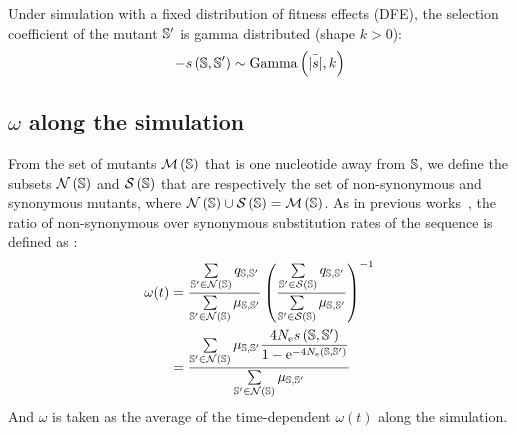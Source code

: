 Under simulation with a fixed distribution of fitness effects (\acrshort{DFE}), the selection coefficient of the mutant $\mathbb{S}'$ is gamma distributed (shape $k > 0$):
\begin{equation}
    - s \left( \mathbb{S},\mathbb{S}'\right) \sim \text{Gamma} \left( \bar{|s|}, k \right)
\end{equation}

\subsection{\texorpdfstring{$\omega$}{ω} along the simulation}
From the set of mutants $\mathcal{M}\left(\mathbb{S}\right)$ that is one nucleotide away from $\mathbb{S}$, we define the subsets $\mathcal{N}\left(\mathbb{S}\right)$ and $\mathcal{S}\left(\mathbb{S}\right)$ that are respectively the set of non-synonymous and synonymous mutants, where $\mathcal{N}\left(\mathbb{S}\right) \cup \mathcal{S}\left(\mathbb{S}\right) = \mathcal{M}\left(\mathbb{S}\right)$.
As in previous works~\citep{Spielman2015, DosReis2015, Jones2016}, the ratio of non-synonymous over synonymous substitution rates of the sequence is defined as :
\begin{align}
    \omega(t) &= \dfrac{\sum\limits_{\mathbb{S}' \in \mathcal{N}\left(\mathbb{S}\right)} q_{\mathbb{S}, \mathbb{S}'}}{\sum\limits_{\mathbb{S}' \in \mathcal{N}\left(\mathbb{S}\right)} \mu_{\mathbb{S}, \mathbb{S}'}} \left( \dfrac{\sum\limits_{\mathbb{S}' \in \mathcal{S}\left(\mathbb{S}\right)} q_{\mathbb{S}, \mathbb{S}'}}{\sum\limits_{\mathbb{S}' \in \mathcal{S}\left(\mathbb{S}\right)} \mu_{\mathbb{S}, \mathbb{S}'}} \right)^{-1}\\
    &= \dfrac{\sum\limits_{\mathbb{S}' \in \mathcal{N}\left(\mathbb{S}\right)} \mu_{\mathbb{S}, \mathbb{S}'} \dfrac{4 N_{\mathrm{e}} s \left( \mathbb{S},\mathbb{S}'\right)}{{1 - \mathrm{e}^{-4 N_{\mathrm{e}} \left( \mathbb{S},\mathbb{S}'\right)} }}}{\sum\limits_{\mathbb{S}' \in \mathcal{N}\left(\mathbb{S}\right)} \mu_{\mathbb{S}, \mathbb{S}'}}
\end{align}
And $\omega$ is taken as the average of the time-dependent $\omega(t)$ along the simulation.